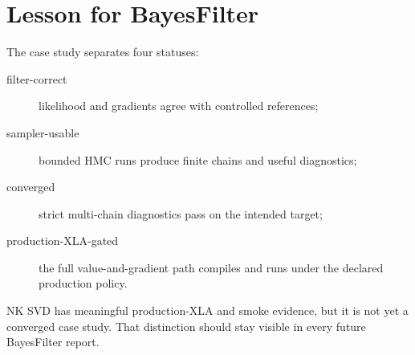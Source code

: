 \section{Lesson for BayesFilter}
\label{sec:bf-nk-svd-lesson}

The case study separates four statuses:
\begin{description}
  \item[filter-correct] likelihood and gradients agree with controlled
    references;
  \item[sampler-usable] bounded HMC runs produce finite chains and useful
    diagnostics;
  \item[converged] strict multi-chain diagnostics pass on the intended target;
  \item[production-XLA-gated] the full value-and-gradient path compiles and runs
    under the declared production policy.
\end{description}
NK SVD has meaningful production-XLA and smoke evidence, but it is not yet a
converged case study.  That distinction should stay visible in every future
BayesFilter report.
